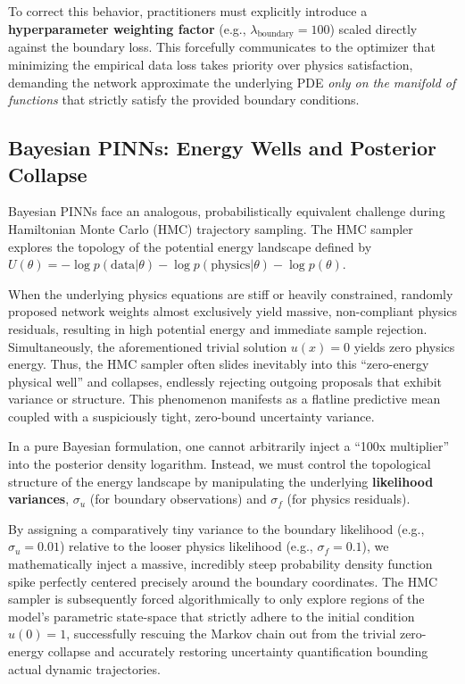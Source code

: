 \documentclass[11pt, a4paper]{article}
\begin{document}
To correct this behavior, practitioners must explicitly introduce a \textbf{hyperparameter weighting factor} (e.g., $\lambda_{\text{boundary}} = 100$) scaled directly against the boundary loss. This forcefully communicates to the optimizer that minimizing the empirical data loss takes priority over physics satisfaction, demanding the network approximate the underlying PDE \textit{only on the manifold of functions} that strictly satisfy the provided boundary conditions.

\subsection{Bayesian PINNs: Energy Wells and Posterior Collapse}
Bayesian PINNs face an analogous, probabilistically equivalent challenge during Hamiltonian Monte Carlo (HMC) trajectory sampling. The HMC sampler explores the topology of the potential energy landscape defined by $U(\theta) = -\log p(\text{data} | \theta) - \log p(\text{physics} | \theta) - \log p(\theta)$. 

When the underlying physics equations are stiff or heavily constrained, randomly proposed network weights almost exclusively yield massive, non-compliant physics residuals, resulting in high potential energy and immediate sample rejection. Simultaneously, the aforementioned trivial solution $u(x)=0$ yields zero physics energy. Thus, the HMC sampler often slides inevitably into this ``zero-energy physical well'' and collapses, endlessly rejecting outgoing proposals that exhibit variance or structure. This phenomenon manifests as a flatline predictive mean coupled with a suspiciously tight, zero-bound uncertainty variance.

In a pure Bayesian formulation, one cannot arbitrarily inject a ``100x multiplier'' into the posterior density logarithm. Instead, we must control the topological structure of the energy landscape by manipulating the underlying \textbf{likelihood variances}, $\sigma_u$ (for boundary observations) and $\sigma_f$ (for physics residuals). 

By assigning a comparatively tiny variance to the boundary likelihood (e.g., $\sigma_u = 0.01$) relative to the looser physics likelihood (e.g., $\sigma_f = 0.1$), we mathematically inject a massive, incredibly steep probability density function spike perfectly centered precisely around the boundary coordinates. The HMC sampler is subsequently forced algorithmically to only explore regions of the model's parametric state-space that strictly adhere to the initial condition $u(0)=1$, successfully rescuing the Markov chain out from the trivial zero-energy collapse and accurately restoring uncertainty quantification bounding actual dynamic trajectories.
\end{document}
